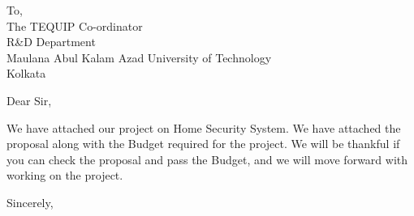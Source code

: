 \documentclass[
	pagenumber=false, %
	parskip=half, %
	fromalign=right, %
	foldmarks=true, %
	addrfield=true %
	]{scrlttr2}
\date{\today} %
\begin{document}

\begin{letter}{To,\\The TEQUIP Co-ordinator \\ R\&D Department \\ Maulana Abul Kalam Azad University of Technology \\ Kolkata} %


\opening{Dear Sir,}

\hfill We have attached our project on Home Security System. We have attached the proposal along with the Budget required for the project. We will be thankful if you can check the proposal and pass the Budget, and we will move forward with working on the project.

\closing{Sincerely,}



\end{letter}
 
\end{document}
